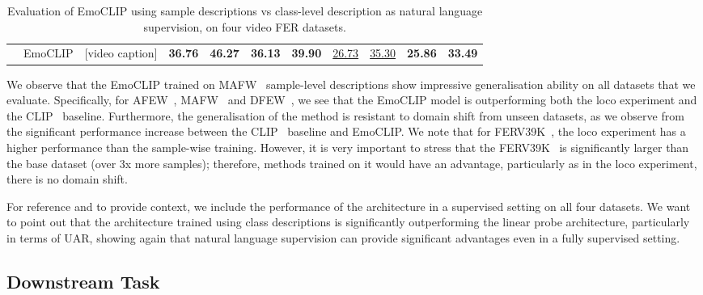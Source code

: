 \documentclass[10pt,twocolumn,letterpaper]{article}
\begin{document}
\begin{table*}[h]
\begin{tabular}{ll|l||ll|ll|ll|ll}
                            & EmoCLIP                       & {[}video caption]     & \textbf{36.76} & \textbf{46.27}                                                & \textbf{36.13} & \textbf{39.90}                                                & \uline{26.73}  & \uline{35.30}                                                    & \textbf{25.86}                            & \textbf{33.49}                                     
\end{tabular}
\caption{Evaluation of EmoCLIP using sample descriptions vs class-level description as natural language supervision, on four video FER datasets.}
\label{tbl:supervised}
\end{table*}

We observe that the EmoCLIP trained on MAFW~\cite{liu_mafw_2022} sample-level descriptions show impressive generalisation ability on all datasets that we evaluate. Specifically, for AFEW~\cite{afew}, MAFW~\cite{liu_mafw_2022} and DFEW~\cite{dfew}, we see that the EmoCLIP model is outperforming both the loco experiment and the CLIP~\cite{radford_CLIP_2021} baseline. Furthermore, the generalisation of the method is resistant to domain shift from unseen datasets, as we observe from the significant performance increase between the CLIP~\cite{radford_CLIP_2021} baseline and EmoCLIP. We note that for FERV39K~\cite{ferv39k}, the loco experiment has a higher performance than the sample-wise training. However, it is very important to stress that the FERV39K~\cite{ferv39k} is significantly larger than the base dataset (over 3x more samples); therefore, methods trained on it would have an advantage, particularly as in the loco experiment, there is no domain shift. 

For reference and to provide context, we include the performance of the architecture in a supervised setting on all four datasets. We want to point out that the architecture trained using class descriptions is significantly outperforming the linear probe architecture, particularly in terms of UAR, showing again that natural language supervision can provide significant advantages even in a fully supervised setting.

\subsection{Downstream Task}
\label{sec:schi}
\end{document}

